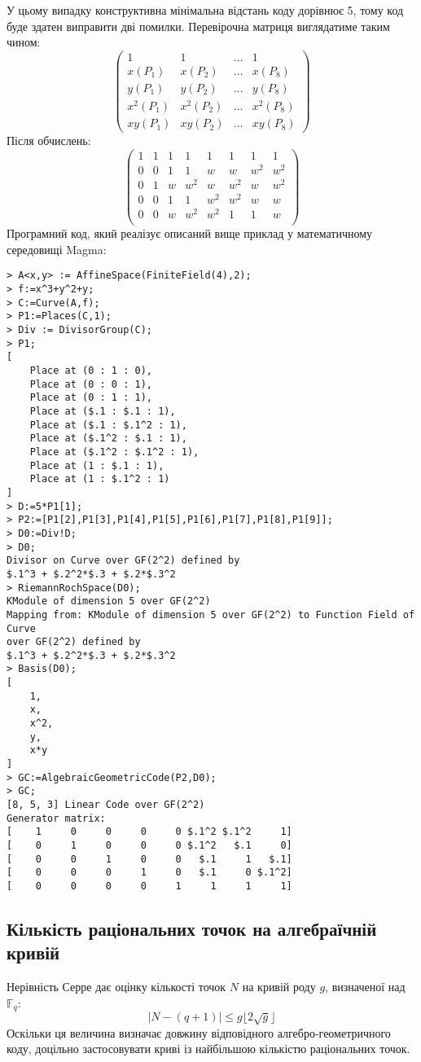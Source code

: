 \documentclass[a4paper,14pt,oneside]{extarticle}
\begin{document}
У цьому випадку конструктивна мінімальна відстань коду дорівнює 5, тому код буде здатен виправити дві помилки.
Перевірочна матриця виглядатиме таким чином:
$$
\begin{pmatrix}
1 & 1 & \dots & 1 \\
x(P_1) & x(P_2) & \dots & x(P_8) \\
y(P_1) & y(P_2) & \dots & y(P_8) \\
x^2(P_1) & x^2(P_2) & \dots & x^2(P_8) \\
xy(P_1) & xy(P_2) & \dots & xy(P_8)
\end{pmatrix}
$$
Після обчислень:
$$
\begin{pmatrix}
1 & 1 & 1 & 1 & 1 & 1 & 1 & 1 \\
0 & 0 & 1 & 1 & w & w & w^2 & w^2 \\
0 & 1 & w & w^2 & w & w^2 & w & w^2 \\
0 & 0 & 1 & 1 & w^2 & w^2 & w & w \\
0 & 0 & w & w^2 & w^2 & 1 & 1 & w \\
\end{pmatrix}
$$
Програмний код, який реалізує описаний вище приклад у математичному середовищі Magma:
\begin{verbatim}
> A<x,y> := AffineSpace(FiniteField(4),2);
> f:=x^3+y^2+y;
> C:=Curve(A,f);
> P1:=Places(C,1);
> Div := DivisorGroup(C);
> P1;
[
    Place at (0 : 1 : 0),
    Place at (0 : 0 : 1),
    Place at (0 : 1 : 1),
    Place at ($.1 : $.1 : 1),
    Place at ($.1 : $.1^2 : 1),
    Place at ($.1^2 : $.1 : 1),
    Place at ($.1^2 : $.1^2 : 1),
    Place at (1 : $.1 : 1),
    Place at (1 : $.1^2 : 1)
]
> D:=5*P1[1];
> P2:=[P1[2],P1[3],P1[4],P1[5],P1[6],P1[7],P1[8],P1[9]];
> D0:=Div!D;
> D0;
Divisor on Curve over GF(2^2) defined by
$.1^3 + $.2^2*$.3 + $.2*$.3^2
> RiemannRochSpace(D0);
KModule of dimension 5 over GF(2^2)
Mapping from: KModule of dimension 5 over GF(2^2) to Function Field of Curve 
over GF(2^2) defined by
$.1^3 + $.2^2*$.3 + $.2*$.3^2
> Basis(D0);
[
    1,
    x,
    x^2,
    y,
    x*y
]
> GC:=AlgebraicGeometricCode(P2,D0);
> GC;
[8, 5, 3] Linear Code over GF(2^2)
Generator matrix:
[    1     0     0     0     0 $.1^2 $.1^2     1]
[    0     1     0     0     0 $.1^2   $.1     0]
[    0     0     1     0     0   $.1     1   $.1]
[    0     0     0     1     0   $.1     0 $.1^2]
[    0     0     0     0     1     1     1     1]
\end{verbatim}

\subsection{Кількість раціональних точок на алгебраїчній кривій}
Нерівність Серре дає оцінку кількості точок $N$ на кривій роду $g$, визначеної над $\mathbb{F}_q$:
$$|N-(q+1)| \le g \lfloor 2 \sqrt{g} \rfloor$$
Оскільки ця величина визначає довжину відповідного алгебро-геометричного коду, доцільно застосовувати криві із найбільшою кількістю 
раціональних точок.
\end{document}
